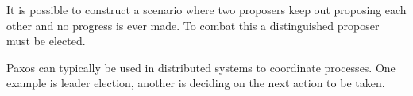 It is possible to construct a scenario where two proposers keep out proposing each other and no progress is ever made. To combat this a distinguished proposer must be elected. 

Paxos can typically be used in distributed systems to coordinate processes. One example is leader election, another is deciding on the next action to be taken.


